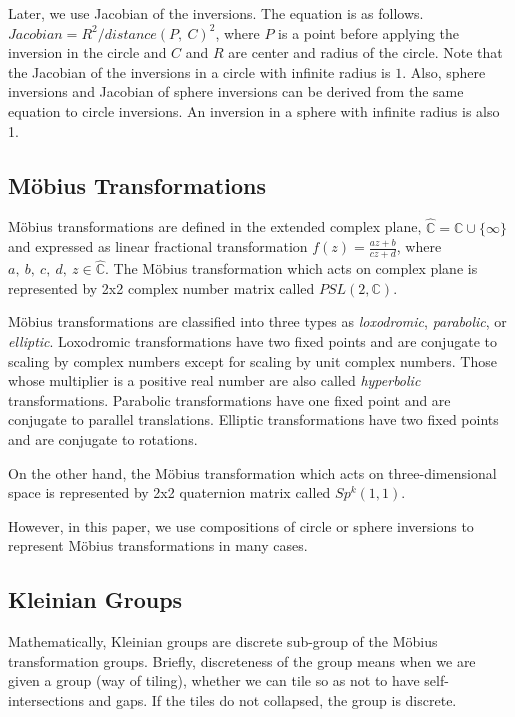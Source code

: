 Later, we use Jacobian of the inversions. The equation is as follows.
$Jacobian = R^2 / distance(P,~C)^2$, where $P$ is a point before
applying the inversion in the circle and $C$ and $R$ are center and
radius of the circle.
Note that the Jacobian of the inversions in a circle with
infinite radius is $1$.
Also, sphere inversions and Jacobian of sphere inversions can be
derived from the same equation to circle inversions.
An inversion in a sphere with infinite radius is also 1.

\subsection{M\"obius Transformations}

M\"obius transformations are defined in the extended complex plane,
$\hat{\mathbb{C}} = \mathbb{C} \cup \{\infty\}$ and expressed as linear
fractional transformation
$f(z)=\frac{az + b}{cz + d}$, where $a,~b,~c,~d,~z \in \hat{\mathbb{C}}$.
The M\"obius transformation which acts on complex plane is represented
by 2x2 complex number matrix called $PSL(2, \mathbb{C})$.

M\"obius transformations are classified into three types as \textit{loxodromic},
\textit{parabolic}, or \textit{elliptic}.
Loxodromic transformations have two fixed points and are conjugate to
scaling by complex numbers except for scaling by unit complex numbers.
Those whose multiplier is a positive real number
are also called \textit{hyperbolic} transformations. Parabolic transformations
have one fixed point and are conjugate to parallel translations.
Elliptic transformations have two fixed points and are conjugate to rotations.

On the other hand, the M\"obius transformation which acts on
three-dimensional space is represented
by 2x2 quaternion matrix called $Sp^k(1, 1)$.

However, in this paper, we use compositions of circle or sphere
inversions to represent M\"obius transformations in many cases.

\subsection{Kleinian Groups}

Mathematically, Kleinian groups are discrete sub-group of the M\"obius transformation
groups. 
Briefly, discreteness of the group means when we are given a group (way of tiling),
whether we can tile so as not to have self-intersections and gaps.
If the tiles do not collapsed, the group is discrete.

